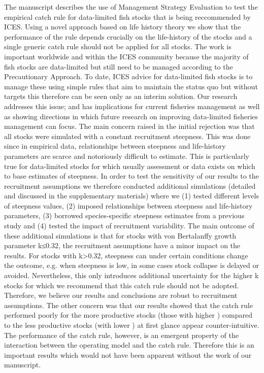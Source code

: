 The manuscript describes the use of Management Strategy Evaluation to test the empirical catch rule for data-limited fish stocks that is being reccommended by ICES. Using a novel approach based on life history theory we  show that the performance of the rule depends crucially on the life-history of the stocks and a single generic catch rule should not be applied for all stocks. The work is important worldwide and within the ICES community because the majority of fish stocks are data-limited but still need to be managed according to the Precautionary Approach. To date, ICES advice for data-limited fish stocks is to manage these using simple rules that aim to maintain the status quo but without targets this therefore can be seen only as an interim solution. Our research  addresses this issue; and has implications for current fisheries management as well as showing directions in which future research on improving data-limited fisheries management can focus.
The main concern raised in the initial rejection was that all stocks were simulated with a constant recruitment steepness. This was done since in empirical data, relationships between steepness and life-history parameters are scarce and notoriously difficult to estimate. This is particularly true for data-limited stocks for which usually assessment or data exists on which to base estimates of steepness. In order to test the sensitivity of our results to the recruitment assumptions we therefore conducted additional simulations (detailed and discussed in the supplementary materials) where we (1) tested different levels of steepness values, (2) imposed relationships between steepness and life-history parameters, (3) borrowed species-specific steepness estimates from a previous study and (4) tested the impact of recruitment variability. 
The main outcome of these additional simulations is that for stocks with von Bertalanffy growth parameter k≤0.32, the recruitment assumptions have a minor impact on the results. For stocks with k>0.32, steepness can under certain conditions change the outcome, e.g. when steepness is low, in some cases stock collapse is delayed or avoided. Nevertheless, this only introduces additional uncertainty for the higher k stocks for which we recommend that this catch rule should not be adopted. Therefore, we believe our results and conclusions are robust to recruitment assumptions.
The other concern was that our results showed that the catch rule performed poorly for the more productive stocks (those with higher ) compared to the less productive stocks (with lower ) at first glance appear counter-intuitive. The performance of the catch rule, however, is an emergent property of the interaction between the operating model and the catch rule. Therefore this is an important results which would not have been apparent without the work of our manuscript.
